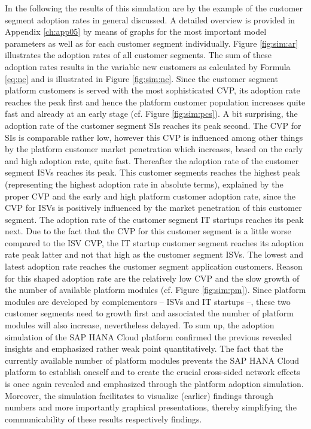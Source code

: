 In the following the results of this simulation are by the example of the customer segment adoption rates in general discussed. A detailed overview is provided in Appendix \ref{ch:app05} by means of graphs for the most important model parameters as well as for each customer segment individually. Figure \ref{fig:sim:ar} illustrates the adoption rates of all customer segments. The sum of these adoption rates results in the variable new customers as calculated by Formula \ref{eq:nc} and is illustrated in Figure \ref{fig:sim:nc}. Since the customer segment platform customers is served with the most sophisticated \ac{CVP}, its adoption rate reaches the peak first and hence the platform customer population increases quite fast and already at an early stage (cf. Figure \ref{fig:sim:pcs}). A bit surprising, the adoption rate of the customer segment \acp{SI} reaches its peak second. The \ac{CVP} for \acp{SI} is comparable rather low, however this \ac{CVP} is influenced among other things by the platform customer market penetration which increases, based on the early and high adoption rate, quite fast. Thereafter the adoption rate of the customer segment \acp{ISV} reaches its peak. This customer segments reaches the highest peak (representing the highest adoption rate in absolute terms), explained by the proper \ac{CVP} and the early and high platform customer adoption rate, since the \ac{CVP} for \acp{ISV} is positively influenced by the market penetration of this customer segment. The adoption rate of the customer segment \ac{IT} startups reaches its peak next. Due to the fact that the \ac{CVP} for this customer segment is a little worse compared to the \ac{ISV} \ac{CVP}, the \ac{IT} startup customer segment reaches its adoption rate peak latter and not that high as the customer segment \acp{ISV}. The lowest and latest adoption rate reaches the customer segment application customers. Reason for this shaped adoption rate are the relatively low \ac{CVP} and the slow growth of the number of available platform modules (cf. Figure \ref{fig:sim:pm}). Since platform modules are developed by complementors -- \acp{ISV} and \ac{IT} startups --, these two customer segments need to growth first and associated the number of platform modules will also increase, nevertheless delayed. To sum up, the adoption simulation of the SAP HANA Cloud platform confirmed the previous revealed insights and emphasized rather weak point quantitatively. The fact that the currently available number of platform modules prevents the SAP HANA Cloud platform to establish oneself and to create the crucial cross-sided network effects is once again revealed and emphasized through the platform adoption simulation. Moreover, the simulation facilitates to visualize (earlier) findings through numbers and more importantly graphical presentations, thereby simplifying the communicability of these results respectively findings.

